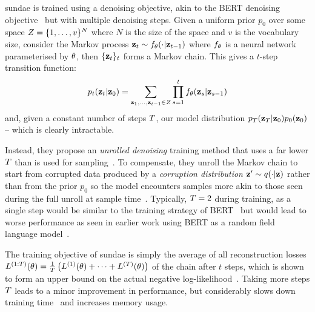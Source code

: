 \gls{sundae} is trained using a denoising objective, akin to the
BERT denoising objective~\cite{wang2019bert} but with multiple denoising steps.
Given a uniform prior $p_0$ over some space $Z = \{1, \dots,
v\}^N$ where $N$ is the size of the space and $v$ is the
vocabulary size, consider the Markov process $\mathbf{z}_t \sim f_\theta(\cdot \vert
\mathbf{z}_{t-1})$ where $f_\theta$ is a neural network parameterised by
$\theta$, then $\{\mathbf{z}_t\}_t$ forms a Markov chain. This gives a
$t$-step transition function: \begin{equation}\label{eq:markov} p_t(\mathbf{z}_t
    \vert \mathbf{z}_0) = \sum\limits_{\mathbf{z}_1, \dots, \mathbf{z}_{t-1} \in
    Z} \prod\limits^t_{s=1} f_\theta(\mathbf{z}_s | \mathbf{z}_{s-1})
\end{equation}\cite{savinov2022stepunrolled} and, given a constant number of
steps $T$, our model distribution
$p_T(\mathbf{z}_T \vert \mathbf{z}_0)p_0(\mathbf{z}_0)$ -- which is
clearly intractable.

Instead, they propose an \textit{unrolled denoising} training method that uses a
far lower $T$ than is used for
sampling~\cite{savinov2022stepunrolled}. To compensate, they unroll the Markov
chain to start from corrupted data produced by a \textit{corruption
distribution} $\mathbf{z}' \sim q(\cdot \vert \mathbf{z})$
rather than from the prior $p_0$ so the model encounters samples more akin to
those seen during the full unroll at sample time~\cite{savinov2022stepunrolled}.
Typically, $T = 2$ during training, as a single step would be similar
to the training strategy of BERT~\cite{devlin2019bert} but would lead to worse
performance as seen in earlier work using BERT as a random field language
model~\cite{wang2019bert}.

The training objective of \gls{sundae} is simply the average of all reconstruction
losses $L^{(1:T)}(\theta) = \frac{1}{T} \left(L^{(1)}(\theta) + \dots +
L^{(T)}(\theta) \right)$ of the chain after $t$ steps, which is shown to form
an upper bound on the actual negative
log-likelihood~\cite{savinov2022stepunrolled}. Taking more steps $T$
leads to a minor improvement in performance, but considerably slows down
training time~\cite{savinov2022stepunrolled} and increases memory usage.


